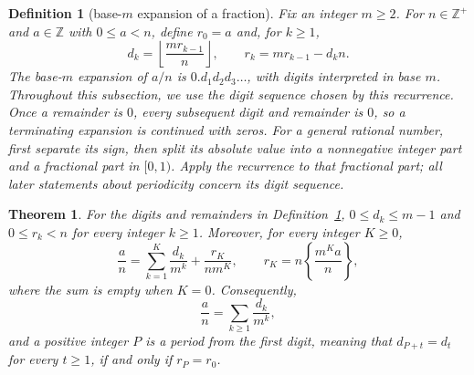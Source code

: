 \documentclass[11pt]{article}
\theoremstyle{ntstyle}
\newtheorem{theorem}{Theorem}[subsection]
\newtheorem{definition}{Definition}[subsection]
\begin{document}
\begin{definition}[base-$m$ expansion of a fraction]\label{def:4.4.1} Fix an integer $m\ge2$. For $n\in\mathbb{Z}^+$ and $a\in\mathbb{Z}$ with $0\le a<n$, define $r_0=a$ and, for $k\ge1$,
	\[
		d_k=\left\lfloor\frac{m r_{k-1}}{n}\right\rfloor,\qquad r_k=m r_{k-1}-d_kn.
	\]
	The base-$m$ expansion of $a/n$ is $0.d_1d_2d_3\ldots$, with digits
	interpreted in base $m$. Throughout this subsection, we use the digit sequence
	chosen by this recurrence. Once a remainder is $0$, every subsequent digit
	and remainder is $0$, so a terminating expansion is continued with zeros.
	For a general rational number, first separate its sign, then split its
	absolute value into a nonnegative integer part and a fractional part in
	$[0,1)$. Apply the recurrence to that fractional part; all later statements
	about periodicity concern its digit sequence.

\end{definition}
\begin{theorem}\label{thm:4.4.1}
	For the digits and remainders in Definition~\ref{def:4.4.1},
	$0\le d_k\le m-1$ and $0\le r_k<n$ for every integer $k\ge1$.
	Moreover, for every integer $K\ge0$,
	\[
		\frac{a}{n}=\sum_{k=1}^{K}\frac{d_k}{m^k}
		+\frac{r_K}{nm^K},\qquad
		r_K=n\left\{\frac{m^Ka}{n}\right\},
	\]
	where the sum is empty when $K=0$. Consequently,
	\[
		\frac{a}{n}=\sum_{k\ge1}\frac{d_k}{m^k},
	\]
	and a positive integer $P$ is a period from the first digit, meaning that
	$d_{P+t}=d_t$ for every $t\ge1$, if and only if $r_P=r_0$.

\end{theorem}
\end{document}
